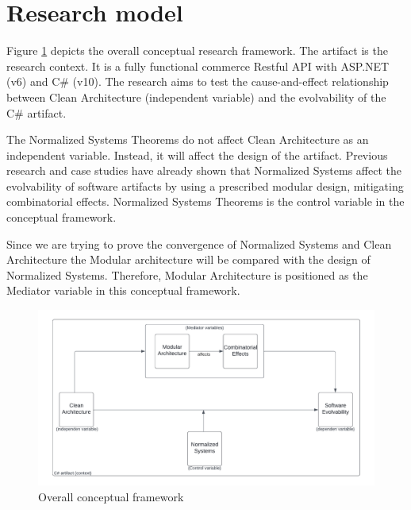 \section{Research model} \label{research_model}

Figure \ref{fig_conceptual_framework} depicts the overall conceptual research framework.
The artifact is the research context. It is a fully functional commerce Restful API with
ASP.NET (v6) and C\# (v10). The research aims to test the cause-and-effect relationship
between Clean Architecture (independent variable) and the evolvability of the C\#
artifact.

The Normalized Systems Theorems do not affect Clean Architecture as an independent
variable. Instead, it will affect the design of the artifact. Previous research and case
studies have already shown that Normalized Systems affect the evolvability of software
artifacts by using a prescribed modular design, mitigating combinatorial effects.
Normalized Systems Theorems is the control variable in the conceptual framework.

Since we are trying to prove the convergence of Normalized Systems and Clean
Architecture the Modular architecture will be compared with the design of Normalized
Systems. Therefore, Modular Architecture is positioned as the Mediator variable in this
conceptual framework.

\begin{figure}[!ht]
    \centering
    \includegraphics[width=1\textwidth]{Figures/conceptual_framework}
    \caption[Overall conceptual framework]{Overall conceptual framework}
    \label{fig_conceptual_framework}
\end{figure}
